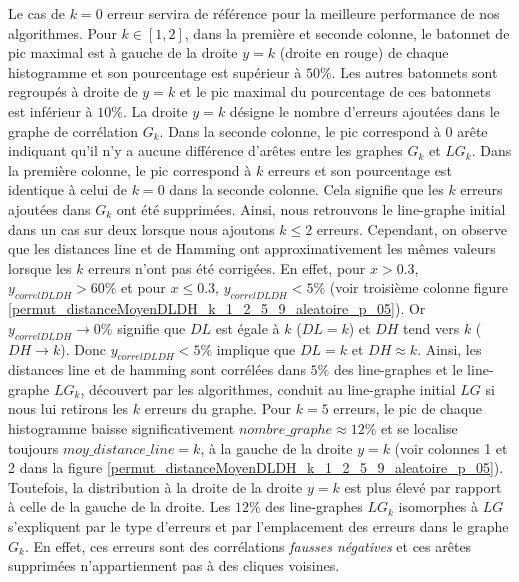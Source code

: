 Le cas de $k=0$ erreur servira de r\'ef\'erence pour la meilleure performance de nos algorithmes.
\newline
Pour $k \in [1,2]$, dans la premi\`ere et seconde colonne, le batonnet de pic maximal est \`a gauche de la droite $y = k$ (droite en rouge) de chaque histogramme et  son pourcentage est sup\'erieur \`a $50 \%$. Les autres batonnets sont regroup\'es \`a droite de $y = k$ et le pic maximal du pourcentage de ces batonnets est inf\'erieur \`a $10\%$. La droite $y = k$ d\'esigne le nombre d'erreurs ajout\'ees dans le graphe de corr\'elation $G_k$.
Dans la seconde colonne, le pic correspond \`a $0$ ar\^ete indiquant qu'il n'y a aucune diff\'erence d'ar\^etes entre les  graphes $G_k$ et $LG_k$. Dans la premi\`ere colonne, le pic correspond \`a $k$ erreurs et son pourcentage est identique \`a celui de $k=0$ dans la seconde colonne. Cela signifie que les $k$ erreurs ajout\'ees dans $G_k$ ont \'et\'e supprim\'ees. Ainsi, nous retrouvons le line-graphe initial dans un cas sur deux lorsque nous ajoutons $k \le 2$ erreurs.
Cependant, on observe que les distances line et de Hamming  ont approximativement les m\^emes valeurs lorsque les $k$ erreurs n'ont pas \'et\'e corrig\'ees. 
En effet, pour $x > 0.3$, $y_{correlDLDH} > 60\%$ et  pour $x \le 0.3$, $y_{correlDLDH} < 5\%$ (voir troisi\`eme colonne figure \ref{permut_distanceMoyenDLDH_k_1_2_5_9_aleatoire_p_05}). Or $y_{correlDLDH} \rightarrow 0\%$ signifie que $DL$ est \'egale \`a $k$ ($DL = k$) et $DH$ tend vers $k$ ($DH \rightarrow k$). Donc $y_{correlDLDH} < 5\%$ implique que $DL = k$ et $DH \approx k$.
Ainsi, les distances line et de hamming sont corr\'el\'ees dans $5\%$ des line-graphes et le line-graphe $LG_k$, d\'ecouvert par les algorithmes, conduit  au line-graphe initial $LG$ si nous lui retirons les $k$ erreurs du graphe.
\newline
Pour $k  = 5$ erreurs,  le pic de chaque histogramme baisse significativement $nombre\_graphe \approx 12 \%$ et se localise toujours $moy\_distance\_line = k$, \`a la gauche de la droite $y = k$ (voir colonnes 1 et 2 dans la figure \ref{permut_distanceMoyenDLDH_k_1_2_5_9_aleatoire_p_05}). 
Toutefois, la distribution \`a la droite de la droite  $y = k$ est plus \'elev\'e par rapport \`a celle de la gauche de la droite.
Les $12\%$ des line-graphes $LG_k$ isomorphes \`a $LG$ s'expliquent  par le type d'erreurs et par l'emplacement des erreurs dans le graphe $G_k$. En effet, ces erreurs sont des corr\'elations {\em fausses n\'egatives} et ces ar\^etes supprim\'ees n'appartiennent pas \`a des cliques voisines.
